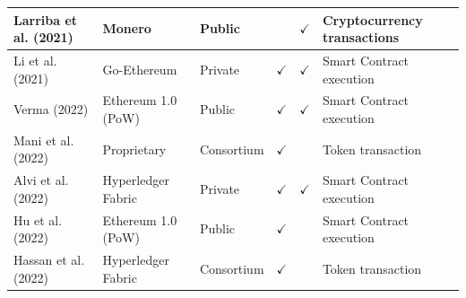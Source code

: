 \documentclass[../access.tex]{subfiles}
\begin{document}
\begin{table}[htbp]
\begin{adjustwidth}{-1cm}{}
\begin{tabular}{m{4.4cm} >{\centering\arraybackslash}m{2.9cm} >{\centering\arraybackslash}m{1.0cm} >{\centering\arraybackslash}m{1.0cm} >{\centering\arraybackslash}m{1.5cm} >{\centering\arraybackslash}m{3.6cm}}
            \hline
            \footnotesize{Larriba et al. (2021) \cite{Larriba2021}}        & \footnotesize{Monero}                          & \footnotesize{Public}                            & {}                                                     & $ \checkmark $                                        & \footnotesize{Cryptocurrency transactions} \\
            \hline
            \footnotesize{Li et al. (2021) \cite{Li2021}}                  & \footnotesize{Go-Ethereum}                     & \footnotesize{Private}                           & $ \checkmark $                                         & $ \checkmark $                                        & \footnotesize{Smart Contract execution}    \\
            \hline
            \footnotesize{Verma (2022) \cite{Verma2022}}                   & \footnotesize{Ethereum 1.0 (PoW)}              & \footnotesize{Public}                            & $ \checkmark $                                         & $ \checkmark $                                        & \footnotesize{Smart Contract execution}    \\
            \hline
            \footnotesize{Mani et al. (2022) \cite{Mani2022}}              & \footnotesize{Proprietary}                     & \footnotesize{Consortium}                        & $ \checkmark $                                         & {}                                                    & \footnotesize{Token transaction}           \\
            \hline
            \footnotesize{Alvi et al. (2022) \cite{Alvi2022}}              & \footnotesize{Hyperledger Fabric}              & \footnotesize{Private}                           & $ \checkmark $                                         & $ \checkmark $                                        & \footnotesize{Smart Contract execution}    \\
            \hline
            \footnotesize{Hu et al. (2022) \cite{Hu2022}}                  & \footnotesize{Ethereum 1.0 (PoW)}              & \footnotesize{Public}                            & $ \checkmark $                                         & {}                                                    & \footnotesize{Smart Contract execution}    \\
            \hline
            \footnotesize{Hassan et al. (2022) \cite{Hassan2022}}          & \footnotesize{Hyperledger Fabric}              & \footnotesize{Consortium}                        & $ \checkmark $                                         & {}                                                    & \footnotesize{Token transaction}           \\

\end{tabular}
\end{adjustwidth}
\end{table}
\end{document}
